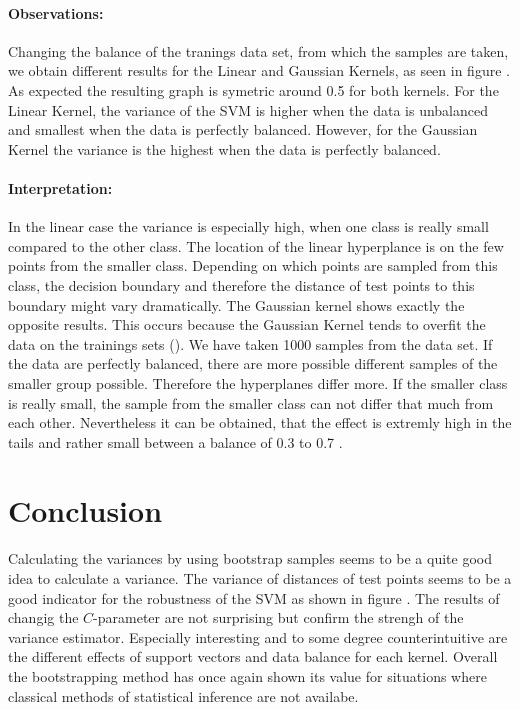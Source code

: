 \documentclass[a4paper]{article}
\begin{document}
\paragraph{Observations:}
Changing the balance of the tranings data set, from which the samples are taken, we obtain different results for the Linear and Gaussian Kernels, as  seen in figure \label{fig5}. As expected the resulting graph is symetric around 0.5 for both kernels. For the Linear Kernel, the variance of the SVM is higher when the data is unbalanced and smallest when the data is perfectly balanced. However, for the Gaussian Kernel the variance is the highest when the data is perfectly balanced. 
\paragraph{Interpretation:}
In the linear case the variance is especially high, when one class is really small compared to the other class. The location of the linear hyperplance is on the few points from the smaller class. Depending on  which points are sampled  from this class, the decision boundary and therefore the distance of test points to this boundary might vary dramatically.
The Gaussian kernel shows exactly the opposite results. This occurs because the Gaussian Kernel tends to overfit the data on the trainings sets (\cite{hastie_elements_2005}). We have taken 1000 samples from the data set. If the data are perfectly balanced, there are more possible different samples of the smaller group possible. Therefore the hyperplanes differ more. If the smaller class is really small, the sample from the smaller class can not differ that much from each other.
Nevertheless it can be obtained, that the effect is extremly high in the tails and rather small between a balance of 0.3 to 0.7 .


\section{Conclusion}

Calculating the variances by using bootstrap samples seems to be a quite good idea to calculate a variance. The variance of distances of test points seems to be a good indicator for the robustness of the SVM as shown in figure \label{fig2}.
The results of changig the $C$-parameter are not surprising but confirm the strengh of the variance estimator.
Especially interesting and to some degree counterintuitive are the different effects of support vectors and data balance for each kernel.
Overall the bootstrapping method has once again shown its value for situations where classical methods of statistical inference are not availabe.
\end{document}
